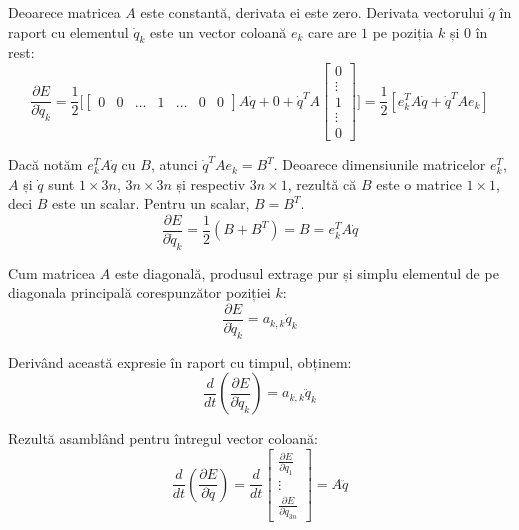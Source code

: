 \documentclass[12pt, a4paper]{article}
\begin{document}
Deoarece matricea $A$ este constantă, derivata ei este zero. Derivata vectorului $\dot{q}$ în raport cu elementul $\dot{q}_k$ este un vector coloană $e_k$ care are $1$ pe poziția $k$ și $0$ în rest:
\begin{equation}
    \frac{\partial E}{\partial \dot{q}_k} = \frac{1}{2} \bigg[ \begin{bmatrix} 0 & 0 & \dots & 1 & \dots & 0 & 0\end{bmatrix} A \dot{q} + 0 + \dot{q}^T A \begin{bmatrix} 0 \\ \vdots \\ 1 \\ \vdots \\ 0 \end{bmatrix} \bigg] = \frac{1}{2} [ e_k^T A \dot{q} + \dot{q}^T A e_k ]
\end{equation}

Dacă notăm $e_k^T A \dot{q}$ cu $B$, atunci $\dot{q}^T A e_k = B^T$. Deoarece dimensiunile matricelor $e_k^T$, $A$ și $\dot{q}$ sunt $1 \times 3n$, $3n \times 3n$ și respectiv $3n \times 1$, rezultă că $B$ este o matrice $1 \times 1$, deci $B$ este un scalar. Pentru un scalar, $B = B^T$.
\begin{equation}
    \frac{\partial E}{\partial \dot{q}_k} = \frac{1}{2} (B + B^T) = B = e_k^T A \dot{q}
\end{equation}

Cum matricea $A$ este diagonală, produsul extrage pur și simplu elementul de pe diagonala principală corespunzător poziției $k$:
\begin{equation}
    \frac{\partial E}{\partial \dot{q}_k} = a_{k,k} \dot{q}_k
\end{equation}

Derivând această expresie în raport cu timpul, obținem:
\begin{equation}
    \frac{d}{dt} \left( \frac{\partial E}{\partial \dot{q}_k} \right) = a_{k,k} \ddot{q}_k
\end{equation}

Rezultă asamblând pentru întregul vector coloană:
\begin{equation}
    \frac{d}{dt}\left(\frac{\partial E}{\partial \dot{q}}\right) = \frac{d}{dt}
    \begin{bmatrix}
        \frac{\partial E}{\partial \dot{q}_1} \\ \vdots \\ \frac{\partial E}{\partial \dot{q}_{3n}}
    \end{bmatrix}
    = A\ddot{q}
\end{equation}
\end{document}
